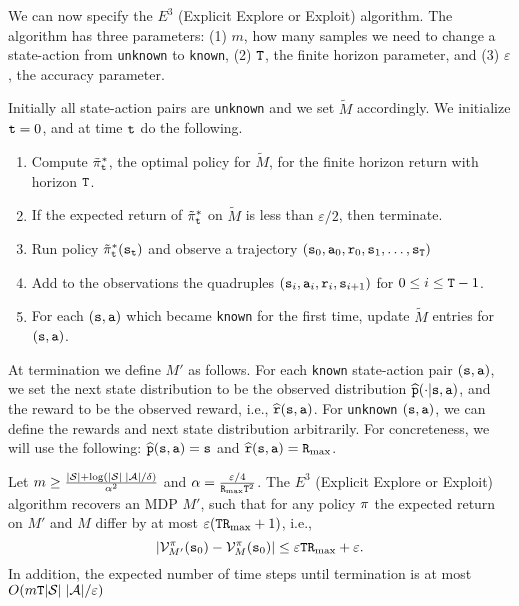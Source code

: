 We can now specify the $E^3$ (Explicit Explore or Exploit)
algorithm. The algorithm has three parameters: (1) $m$, how many
samples we need to change a state-action from \texttt{unknown} to \texttt{known}, (2)
${\tt T}$, the finite horizon parameter, and (3) $\varepsilon$, the
accuracy parameter.

Initially all state-action pairs are \texttt{unknown} and we set $\widetilde{M}$
accordingly. We initialize ${\tt t}=0$, and at time ${\tt t}$ do the
following.
\begin{enumerate}
\item
Compute $\tilde{\pi}^*_{\tt t}$, the optimal policy for
$\widetilde{M}$, for the finite horizon return with horizon ${\tt T}$.
\item
If the expected return of $\tilde{\pi}^*_{\tt t}$ on $\widetilde{M}$
is less than $\varepsilon/2$, then terminate.
\item
Run policy $\tilde{\pi}^*_{\tt t}({\tt s}_{{\tt t}})$ and observe a trajectory $({\tt s}_0,{\tt a}_0,{\tt r}_0,{\tt s}_1, \ldots, {\tt s}_{\tt T})$
\item
Add to the observations the quadruples
$({\tt s}_i,{\tt a}_i,{\tt r}_i,{\tt s}_{i+1})$
for $0\leq i\leq {\tt T}-1$.
\item
For each $({\tt s},{\tt a})$ which became \texttt{known} for the first time,
update $\widetilde{M}$ entries for $({\tt s},{\tt a})$.
\end{enumerate}

At termination we define $M'$ as follows. For each \texttt{known} state-action pair
$({\tt s},{\tt a})$, we set the next state distribution to be the
observed distribution $\widehat{{\tt p}}(\cdot|{\tt s},{\tt a})$, and the
reward to be the observed reward, i.e.,
$\widehat{{\tt r}}({\tt s},{\tt a})$.
%
For \texttt{unknown} $({\tt s},{\tt a})$, we can define the rewards and next
state distribution arbitrarily. For concreteness, we will use the
following: $\widehat{{\tt p}}({\tt s},{\tt a})={\tt s}$ and
$\widehat{{\tt r}}({\tt s},{\tt a})={\tt R}_{\max }$.

\begin{theorem}
Let $m\geq
\frac{|\mathcal{S}|+\log(|\mathcal{S}|\;|\mathcal{A}|/\delta)}{\alpha^2}$
and $\alpha=\frac{\varepsilon/4}{{\tt R}_{\max } {\tt T}^2}$.
%
The $E^3$ (Explicit Explore or Exploit) algorithm recovers an MDP
$M'$, such that for any policy $\pi$ the expected return on $M'$
and $M$ differ by at most $\varepsilon({\tt T}{\tt R}_{\max }+1)$, i.e.,
$$|\mathcal{V}^\pi_{M'}({\tt s}_0)-\mathcal{V}^\pi_M({\tt s}_0) |\leq
\varepsilon{\tt T}{\tt R}_{\max }+\varepsilon. $$
 In addition, the expected number of time
steps until termination is at most $O(m{\tt T}
|\mathcal{S}|\;|\mathcal{A}|/\varepsilon)$
\end{theorem}

